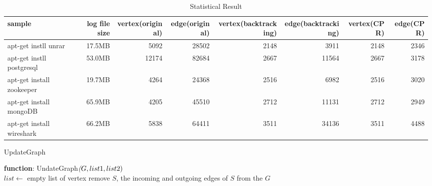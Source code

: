 \begin{table*}[!hp]
	\centering
	\caption{Statistical Result}
	\label{my-label}
	\begin{scriptsize}
		\begin{tabular}{|l|r|r|r|r|r|r|r|}
			\hline
			sample                    & log file size & vertex(original) & edge(original) & vertex(backtracking) & edge(backtracking) & vertex(CPR) & edge(CPR) \\ \hline
			apt-get instll unrar      & 17.5MB        & 5092             & 28502          & 2148                 & 3911               & 2148        & 2346      \\ \hline
			apt-get instll postgresql & 53.0MB        & 12174            & 82684          & 2667                 & 11564              & 2667        & 3178      \\ \hline
			apt-get install zookeeper & 19.7MB        & 4264             & 24368          & 2516                 & 6982               & 2516        & 3020      \\ \hline
			apt-get install mongoDB   & 65.9MB        & 4205             & 45510          & 2712                 & 11131              & 2712        & 2949      \\ \hline
			apt-get install wireshark & 66.2MB        & 5838             & 64411          & 3511                 & 34136              & 3511        & 4488      \\ \hline
		\end{tabular}%
	\end{scriptsize}
	
\end{table*}

\begin{algorithm}
	\caption{UpdateGraph}
	\textbf{function}: UndateGraph$\textit(G, list1, list2)$\\
	$list \leftarrow$ empty list of vertex\;
	remove $S$, the incoming and outgoing edges of $S$ from the $G$\;
	\label{alg:update}
\end{algorithm}



